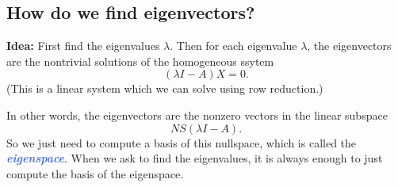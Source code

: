 \documentclass[10pt]{article}
\newcommand{\demph}[1]{\textcolor{RoyalBlue}{\textbf{\slshape #1}}} %
\theoremstyle{definition}
\begin{document}
\subsection{How do we find eigenvectors?}

\textbf{Idea:} First find the eigenvalues $\lambda$. Then for each eigenvalue
$\lambda$, the eigenvectors are the nontrivial solutions of the homogeneous
ssytem
\begin{equation*}
  (\lambda I-A)X =0.
\end{equation*}
(This is a linear system which we can solve using row reduction.)

In other words, the eigenvectors are the nonzero vectors in the linear
subspace
\begin{equation*}
  NS(\lambda I-A).
\end{equation*}
So we just need to compute a basis of this nullspace, which is called the
\demph{eigenspace}. When we ask to find the eigenvalues, it is always enough
to just compute the basis of the eigenspace.
\end{document}

